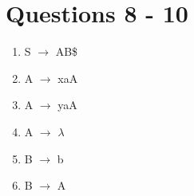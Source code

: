 \documentclass{article}
\begin{document}
\section*{Questions 8 - 10}
\vspace{-1.5em}
\begin{multicols}{2}
  \begin{enumerate}
    \setlength\itemsep{-.25em}
    \item S $\rightarrow$ AB\$
    \item A $\rightarrow$ xaA
    \item A $\rightarrow$ yaA
    \item A $\rightarrow$ $\lambda$
    \item B $\rightarrow$ b
    \item B $\rightarrow$ A\newline\newline\newline\newline\newline\newline\newline\newline
  \end{enumerate}
  

\end{multicols}
\end{document}
